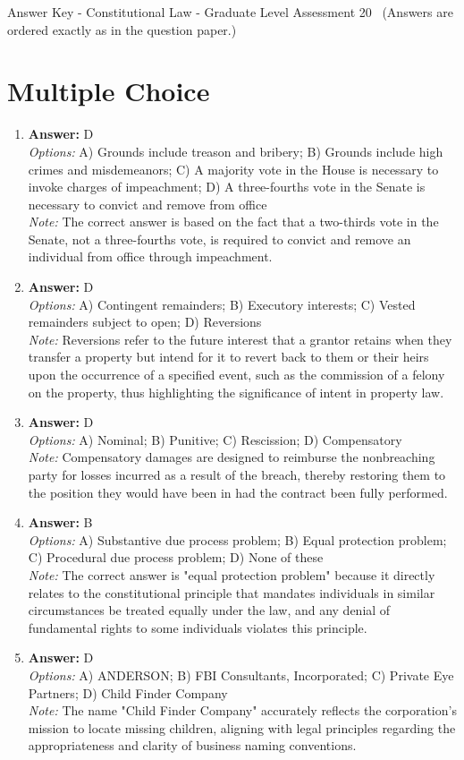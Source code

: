 \documentclass[12pt]{article}
\begin{document}
\begin{center}
Answer Key - Constitutional Law - Graduate Level Assessment 20 \
\small (Answers are ordered exactly as in the question paper.)
\end{center}

\section*{Multiple Choice}
\begin{enumerate}[label=\arabic*.]
\item \textbf{Answer:} D
\\ \textit{Options:} A) Grounds include treason and bribery; B) Grounds include high crimes and misdemeanors; C) A majority vote in the House is necessary to invoke charges of impeachment; D) A three-fourths vote in the Senate is necessary to convict and remove from office
\\ \textit{Note:} The correct answer is based on the fact that a two-thirds vote in the Senate, not a three-fourths vote, is required to convict and remove an individual from office through impeachment.
\item \textbf{Answer:} D
\\ \textit{Options:} A) Contingent remainders; B) Executory interests; C) Vested remainders subject to open; D) Reversions
\\ \textit{Note:} Reversions refer to the future interest that a grantor retains when they transfer a property but intend for it to revert back to them or their heirs upon the occurrence of a specified event, such as the commission of a felony on the property, thus highlighting the significance of intent in property law.
\item \textbf{Answer:} D
\\ \textit{Options:} A) Nominal; B) Punitive; C) Rescission; D) Compensatory
\\ \textit{Note:} Compensatory damages are designed to reimburse the nonbreaching party for losses incurred as a result of the breach, thereby restoring them to the position they would have been in had the contract been fully performed.
\item \textbf{Answer:} B
\\ \textit{Options:} A) Substantive due process problem; B) Equal protection problem; C) Procedural due process problem; D) None of these
\\ \textit{Note:} The correct answer is "equal protection problem" because it directly relates to the constitutional principle that mandates individuals in similar circumstances be treated equally under the law, and any denial of fundamental rights to some individuals violates this principle.
\item \textbf{Answer:} D
\\ \textit{Options:} A) ANDERSON; B) FBI Consultants, Incorporated; C) Private Eye Partners; D) Child Finder Company
\\ \textit{Note:} The name "Child Finder Company" accurately reflects the corporation's mission to locate missing children, aligning with legal principles regarding the appropriateness and clarity of business naming conventions.
\end{enumerate}
\end{document}
